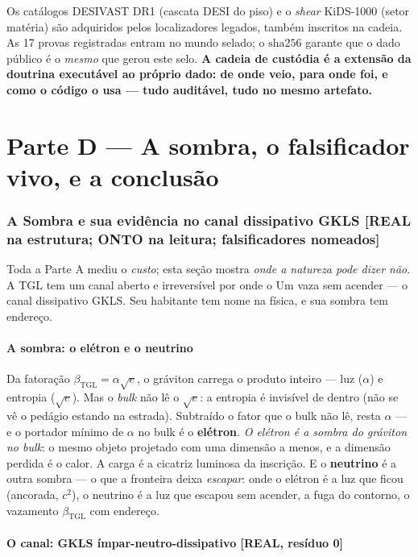 \documentclass[11pt]{article}
\newcommand{\bTGL}{\beta_{\mathrm{TGL}}}\newcommand{\Msun}{M_{\odot}}\newcommand{\TGL}{\mathrm{TGL}}
\theoremstyle{definition}\newtheorem{deriv}{Derivação}
\begin{document}
Os catálogos DESIVAST DR1 (cascata DESI do piso) e o \emph{shear} KiDS-1000 (setor matéria) são adquiridos pelos localizadores legados, também inscritos na cadeia. As 17 provas registradas entram no mundo selado; o $\mathrm{sha}256$ garante que o dado público é o \emph{mesmo} que gerou este selo. \textbf{A cadeia de custódia é a extensão da doutrina executável ao próprio dado: de onde veio, para onde foi, e como o código o usa --- tudo auditável, tudo no mesmo artefato.}

\part{Parte D --- A sombra, o falsificador vivo, e a conclusão}

\section{A Sombra e sua evidência no canal dissipativo GKLS \textsf{[REAL na estrutura; ONTO na leitura; falsificadores nomeados]}}

Toda a Parte A mediu o \emph{custo}; esta seção mostra \emph{onde a natureza pode dizer não}. A TGL tem um canal aberto e irreversível por onde o Um vaza sem acender --- o canal dissipativo GKLS. Seu habitante tem nome na física, e sua sombra tem endereço.

\subsection*{A sombra: o elétron e o neutrino}

Da fatoração $\bTGL=\alpha\sqrt e$, o gráviton carrega o produto inteiro --- luz ($\alpha$) e entropia ($\sqrt e$). Mas o \emph{bulk} não lê o $\sqrt e$: a entropia é invisível de dentro (não se vê o pedágio estando na estrada). Subtraído o fator que o bulk não lê, resta $\alpha$ --- e o portador mínimo de $\alpha$ no bulk é o \textbf{elétron}. \emph{O elétron é a sombra do gráviton no bulk}: o mesmo objeto projetado com uma dimensão a menos, e a dimensão perdida é o calor. A carga é a cicatriz luminosa da inscrição. E o \textbf{neutrino} é a outra sombra --- o que a fronteira deixa \emph{escapar}: onde o elétron é a luz que ficou (ancorada, $c^2$), o neutrino é a luz que escapou sem acender, a fuga do contorno, o vazamento $\bTGL$ com endereço.

\subsection*{O canal: GKLS ímpar-neutro-dissipativo \textsf{[REAL, resíduo 0]}}
\end{document}
